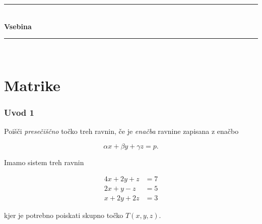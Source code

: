 \documentclass[8pt,aspectratio=169]{beamer} %
\begin{document}
\begin{frame}[plain,noframenumbering,label=contentpage]
	\begin{center}
		\hspace*{0mm}\rule{130mm}{0.5mm}\\
		\vspace{1.5mm}%
		{\Huge \textbf{Vsebina}}\\
		\vspace{-1mm}%
		\hspace*{0mm}\rule{130mm}{0.5mm}
	\end{center}
	\vspace*{5mm}
	\begin{minipage}[t]{5mm}
		~
	\end{minipage}
	\hfill
	\begin{minipage}[t]{135mm}	
		\normalsize
		\tableofcontents[
		sectionstyle=show,
		subsectionstyle=show/show
		]
	\end{minipage}
	\vfill	
\end{frame}




\section{Matrike}
\setcounter{section}{1}

\begin{frame}[plain,noframenumbering,label=newsection]
	\vfill
	\begin{center}
		
		\vspace*{5mm}
		\textcolor{royalblue1}{\textbf{\insertsectionhead}}
	\end{center}
	\vfill
\end{frame}


\begin{frame}
	\frametitle{Uvod 1}
	
	 Poišči \emph{presečiščno} točko treh ravnin, če je \emph{enačba} ravnine zapisana z enačbo
	
	\[
	\alpha x + \beta y + \gamma z = p.
	\]
	
	 Imamo sistem treh ravnin
	
	\begin{equation} \label{eq:plane_system}
		\begin{split}
		4 x + 2 y + z & = 7\\
		2 x + y - z & = 5\\
		x + 2 y + 2 z & = 3
		\end{split}	
	\end{equation}
	
	kjer je potrebno poiskati skupno točko $T(x,y,z)$.
	
\end{frame}
\end{document}
